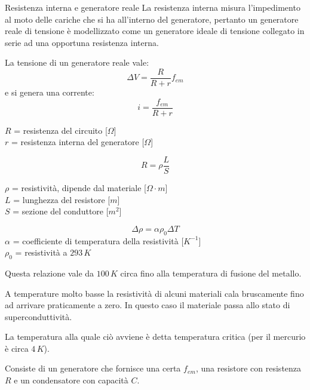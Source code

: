 \documentclass[a4paper,11pt,italian]{article}
\begin{document}
\begin{description}
\begin{soloscientifico}
  \item[Resistenza interna e generatore reale] 
  La resistenza interna misura l’impedimento al moto delle cariche che si ha all’interno del generatore, pertanto un generatore reale di tensione è modellizzato come un generatore ideale di tensione collegato in serie ad una opportuna resistenza interna.
  
  La tensione di un generatore reale vale:
  \[ \Delta V = \frac{R}{R+r} f_{em} \]
  e si genera una corrente:
  \[ i = \frac{f_{em}}{R+r} \]
  \begin{multicols}{2}
  $ R $ = resistenza del circuito [$ \Omega $]\\
  $ r $ = resistenza interna del generatore [$ \Omega $]
  \end{multicols}
\end{soloscientifico}   %
 
  \item[Seconda legge di Ohm] 
  \[ R = \rho \frac{L}{S} \]
  \begin{multicols}{2}
  $ \rho $ = resistività, dipende dal materiale [$ \Omega \cdot m $]\\
  $ L $ = lunghezza del resistore [$ m $]\\
  $ S $ = sezione del conduttore [$ m^2 $]
  \end{multicols}
  
  \item[Dipendenza della resistività dalla temperatura]
  \[ \Delta \rho = \alpha \rho_0 \Delta T  \]
  $ \alpha $ = coefficiente di temperatura della resistività [$ K^{-1} $]\\
  $ \rho_0 $ = resistività a $ 293 \, K $
  
  Questa relazione vale da $ 100 \, K $ circa fino alla temperatura di fusione del metallo.
  
  \item[Superconduttività] 
  A temperature molto basse la resistività di alcuni materiali cala bruscamente fino ad arrivare praticamente a zero.
  In questo caso il materiale passa allo stato di superconduttività.
  
  La temperatura alla quale ciò avviene è detta temperatura critica (per il mercurio è circa $ 4 \, K $).
  
  \item[Circuito RC] 
  Consiste di un generatore che fornisce una certa $ f_{em} $, una resistore con resistenza $ R $ e un condensatore con capacità $ C $.


\end{description}
\end{document}
